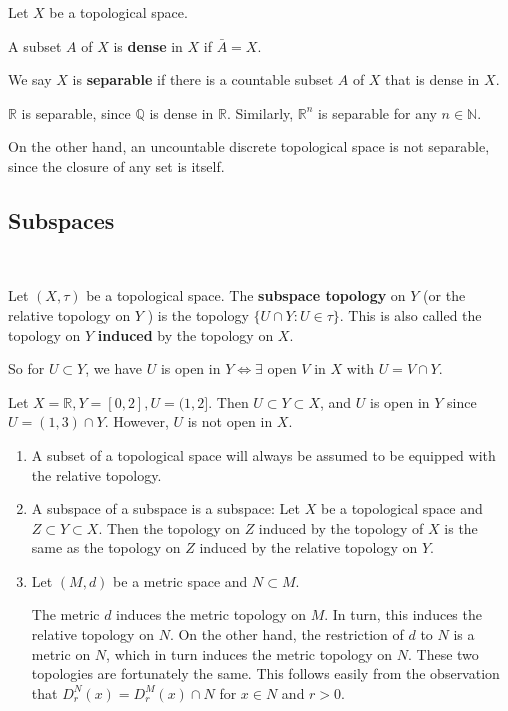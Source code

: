 \documentclass[a4paper]{article}
\begin{document}
\begin{definition}
    Let $X$ be a topological space.

A subset $A$ of $X$ is \textbf{dense} in $X$ if $\bar{A}=X$.

We say $X$ is \textbf{separable} if there is a countable subset $A$ of $X$ that is dense in $X$.
\end{definition}

\begin{example}
    $\mathbb{R}$ is separable, since $\mathbb{Q}$ is dense in $\mathbb{R}$. Similarly, $\mathbb{R}^{n}$ is separable for any $n \in \mathbb{N}$.

On the other hand, an uncountable discrete topological space is not separable, since the closure of any set is itself.
\end{example}

\subsection{Subspaces}\ \vspace{-1.5em}
\begin{definition}
    Let $(X,\tau)$ be a topological space. The \textbf{subspace topology} on $Y$ (or the relative topology on $Y$ ) is the topology $\{U \cap Y: U \in \tau\}$. This is also called the topology on $Y$ \textbf{induced} by the topology on $X$.

    So for $U \subset Y$, we have $U$ is open in $Y \Longleftrightarrow \exists$ open $V$ in $X$ with $U=V \cap Y$.
\end{definition}

\begin{example}
    Let $ X = \mathbb{R}, Y = [0,2], U = (1,2] $. Then $ U \subset Y \subset X $, and $U$ is open in $Y$ since $U = (1,3)\cap Y$. However, $U$ is not open in $X$. 
\end{example}

\begin{remark}
    \begin{enumerate}
        \item A subset of a topological space will always be assumed to be equipped with the relative topology.
      
        \item A subspace of a subspace is a subspace: Let $X$ be a topological space and $Z \subset Y \subset X$. Then the topology on $Z$ induced by the topology of $X$ is the same as the topology on $Z$ induced by the relative topology on $Y$.
        
        \item Let $(M, d)$ be a metric space and $N \subset M$.
        
        The metric $d$ induces the metric topology on $M$. In turn, this induces the relative topology on $N$. On the other hand, the restriction of $d$ to $N$ is a metric on $N$, which in turn induces the metric topology on $N$. These two topologies are fortunately the same. This follows easily from the observation that $D_{r}^{N}(x)=D_{r}^{M}(x) \cap N$ for $x \in N$ and $r>0$.
      \end{enumerate}
\end{remark}
\end{document}
